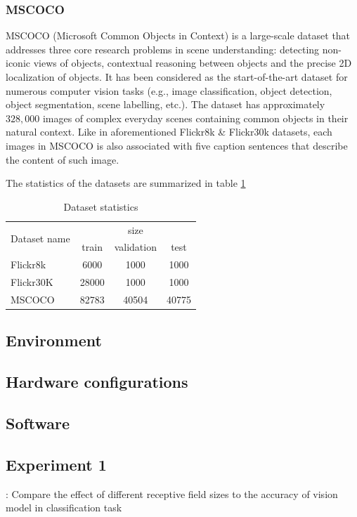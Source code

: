 \subsubsection{MSCOCO}
MSCOCO \cite{DBLP:journals/corr/LinMBHPRDZ14} (Microsoft Common Objects in Context) is a large-scale dataset that addresses three core research problems in scene understanding: detecting non-iconic views of objects, contextual reasoning between objects and the precise 2D localization of objects. It has been considered as the start-of-the-art dataset for numerous computer vision tasks (e.g., image classification, object detection, object segmentation, scene labelling, etc.). The dataset has approximately $328,000$ images of complex everyday scenes containing common objects in their natural context. Like in aforementioned Flickr8k \& Flickr30k datasets, each images in MSCOCO is also associated with five caption sentences that describe the content of such image.

The statistics of the datasets are summarized in table \ref{tab:dataset-statistics}
\begin{table}
	\centering
	\label{tab:dataset-statistics}
	\begin{tabular}{l|c|c|c}
		\toprule
		\multirow{2}{*}{Dataset name} & \multicolumn{3}{c}{size} \\ \cline{2-4}
		& train & validation & test \\ \midrule
		Flickr8k & 6000 & 1000 & 1000 \\
		Flickr30K & 28000 & 1000 & 1000 \\
		MSCOCO & 82783 & 40504 & 40775 \\
		\bottomrule
	\end{tabular}
	\caption{Dataset statistics}
\end{table}
\subsection{Environment}
	\subsection{Hardware configurations}
	\subsection{Software}

\subsection{Experiment 1}{: Compare the effect of different receptive field sizes to the accuracy of vision model in classification task}

